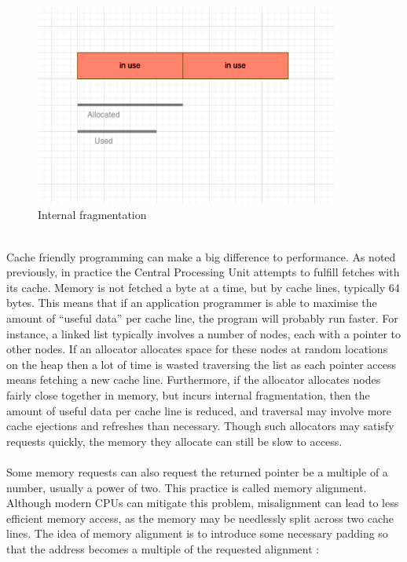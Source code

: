 \documentclass{article}
\begin{document}
\\
\begin{figure}[htbp]
	\centering
	\includegraphics[width=10cm]{internal_fragmentation}
	\captionsetup{width=10cm}
	\caption{Internal fragmentation}
\end{figure}
\\
Cache friendly programming can make a big difference to performance. As noted previously, in practice the Central Processing Unit attempts to fulfill fetches with its cache. Memory is not fetched a byte at a time, but by cache lines, typically 64 bytes. This means that if an application programmer is able to maximise the amount of ``useful data'' per cache line, the program will probably run faster. For instance, a linked list typically involves a number of nodes, each with a pointer to other nodes. If an allocator allocates space for these nodes at random locations on the heap then a lot of time is wasted traversing the list as each pointer access means fetching a new cache line. Furthermore, if the allocator allocates nodes fairly close together in memory, but incurs internal fragmentation, then the amount of useful data per cache line is reduced, and traversal may involve more cache ejections and refreshes than necessary. Though such allocators may satisfy requests quickly, the memory they allocate can still be slow to access.\\
\\
Some memory requests can also request the returned pointer be a multiple of a number, usually a power of two. This practice is called memory alignment. Although modern CPUs can mitigate this problem, misalignment can lead to less efficient memory access, as the memory may be needlessly split across two cache lines. The idea of memory alignment is to introduce some necessary padding so that the address becomes a multiple of the requested alignment \cite{allignment}:\\
\end{document}
